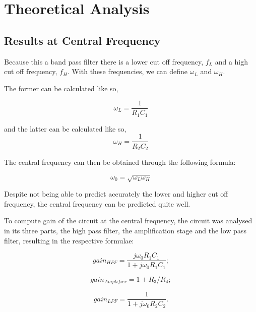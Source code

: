 \section{Theoretical Analysis}
\label{sec:theoretical analysis}

\subsection{Results at Central Frequency}

\indent

Because this a band pass filter there is a lower cut off frequency, $f_L$ and a high cut off frequency, $f_H$. With these frequencies, we can define $\omega_L$ and $\omega_H$.

The former can be calculated like so,


\[\omega_L = \frac{1}{R_1 C_1}\tag{1}\label{1}\]

and the latter can be calculated like so, \[\omega_H = \frac{1}{R_2 C_2}\tag{2}\label{2}\]

The central frequency can then be obtained through the following formula: 

\[\omega _0 =\sqrt{\omega _L \omega _H}\tag{3}\label{3}\]

\vspace{0.5cm}
\begin{center}
\end{center}

Despite not being able to predict accurately the lower and higher cut off frequency, the central frequency can be predicted quite well. 

\vspace{1cm}

To compute gain of the circuit at the central frequency, the circuit was analysed in its three parts,  the high pass filter, the amplification stage and the low pass filter, resulting in the respective formulae:

\vspace{0.5cm}

\[gain_{HPF}=\frac{j\omega _0 R_1 C_1}{1+j \omega _0 R_1 C_1};\tag{4}\label{4}\]
 
\[gain_{Amplifier}=1+R_3/R_4;\tag{5}\label{5}\]
 
\[gain_{LPF} = \frac{1}{1+j \omega _0 R_2 C_2}.\tag{6}\label{6}\]
 
\vspace{1cm}
 
